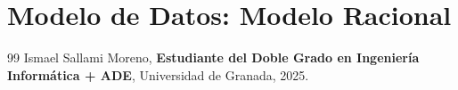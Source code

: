 \documentclass[a4paper,12pt]{book}
\begin{document}
\chapter{Modelo de Datos: Modelo Racional}

 



\newpage
\begin{thebibliography}{99}
Ismael Sallami Moreno, \textbf{Estudiante del Doble Grado en Ingeniería Informática + ADE}, Universidad de Granada, 2025.

\end{thebibliography}
\end{document}
